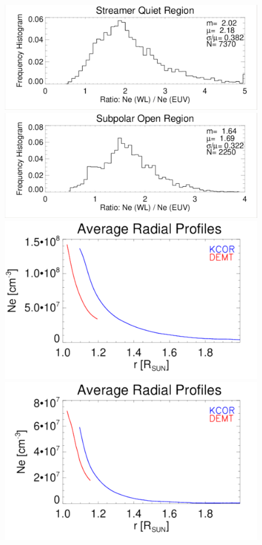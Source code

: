 \documentclass[baaa]{baaa}
\begin{document}
\begin{figure}[!ht]
  \centering
  \includegraphics[width=\columnwidth]{comparison_quiet_region.pdf}
  \includegraphics[width=\columnwidth]{comparison_open.pdf}\\
  \includegraphics[width=0.7\columnwidth]{Average1.pdf}
  \hskip 2.5cm
  \includegraphics[width=0.7\columnwidth]{AverageN.pdf}

\end{figure}
\end{document}
